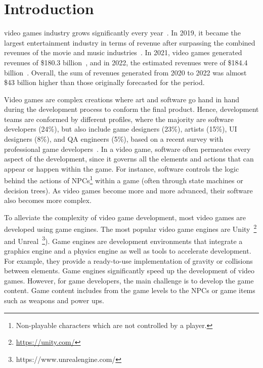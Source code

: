 \section{Introduction}

 video games industry grows significantly every year~\cite{rykala2020growth}. In 2019, it became the largest entertainment industry in terms of revenue after surpassing the combined revenues of the movie and music industries~\cite{politowski2021game}. In 2021, video games generated revenues of \$180.3 billion~\cite{wijman2021games}, and in 2022, the estimated revenues were of \$184.4 billion~\cite{wijman2022games}. Overall, the sum of revenues generated from 2020 to 2022 was almost \$43 billion higher than those originally forecasted for the period. 

Video games are complex creations where art and software go hand in hand during the development process to conform the final product. Hence, development teams are conformed by different profiles, where the majority are software developers (24\%), but also include game designers (23\%), artists (15\%), UI designers (8\%), and QA engineers (5\%), based on a recent survey with professional game developers~\cite{devNation}. In a video game, software often permeates every aspect of the development, since it governs all the elements and actions that can appear or happen within the game. For instance, software controls the logic behind the actions of NPCs\footnote{Non-playable characters which are not controlled by a player.} within a game (often through state machines or decision trees). As video games become more and more advanced, their software also becomes more complex.

To alleviate the complexity of video game development, most video games are developed using game engines. The most popular video game engines are Unity~\footnote{\url{https://unity.com/}} and Unreal~\footnote{https://www.unrealengine.com/}). Game engines are development environments that integrate a graphics engine and a physics engine as well as tools to accelerate development. For example, they provide a ready-to-use implementation of gravity or collisions between elements. Game engines significantly speed up the development of video games. However, for game developers, the main challenge is to develop the game content. Game content includes from the game levels to the NPCs or game items such as weapons and power ups.

